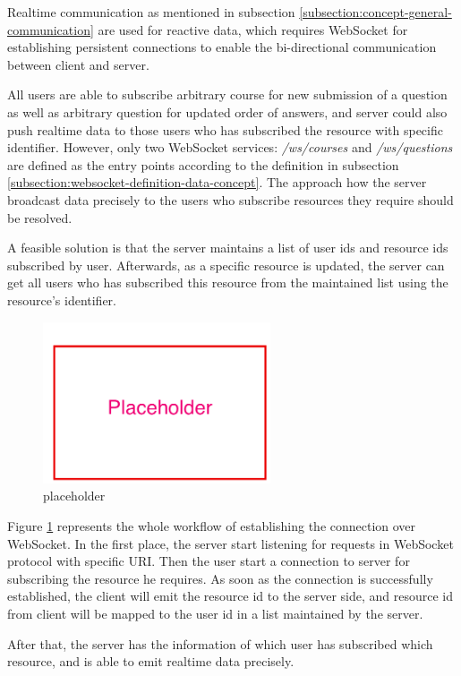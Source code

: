 
Realtime communication as mentioned in subsection \ref{subsection:concept-general-communication} are used for reactive data, which requires WebSocket for establishing persistent connections to enable the bi-directional communication between client and server.


All users are able to subscribe arbitrary course for new submission of a question as well as arbitrary question for updated order of answers, and server could also push realtime data to those users who has subscribed the resource with specific identifier. However, only two WebSocket services: \textit{/ws/courses} and \textit{/ws/questions} are defined as the entry points according to the definition in subsection \ref{subsection:websocket-definition-data-concept}. The approach how the server broadcast data precisely to the users who subscribe resources they require should be resolved.

A feasible solution is that the server maintains a list of user ids and resource ids subscribed by user. Afterwards, as a specific resource is updated, the server can get all users who has subscribed this resource from the maintained list using the resource's identifier.

\begin{figure}[!htbp]
  \centering
    \includegraphics[width=0.6\textwidth]{Figures/placeholder.png}
  \caption{placeholder}
  \label{fig:websocket-connection-sequence-concept}
\end{figure}


Figure \ref{fig:websocket-connection-sequence-concept} represents the whole workflow of establishing the connection over WebSocket. In the first place, the server start listening for requests in WebSocket protocol with specific URI. Then the user start a connection to server for subscribing the resource he requires. As soon as the connection is successfully established, the client will emit the resource id to the server side, and resource id from client will be mapped to the user id in a list maintained by the server.

After that, the server has the information of which user has subscribed which resource, and is able to emit realtime data precisely.